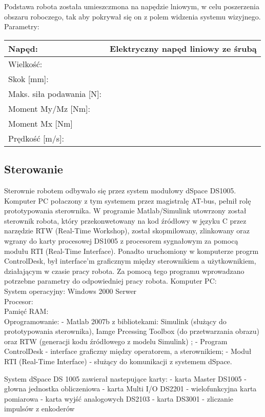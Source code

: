 \vspace{5mm}

Podstawa robota została umieszczmona na napędzie lniowym, w celu poszerzenia obszaru roboczego, tak aby pokrywał się on z polem widzenia systemu wizyjnego.\\
Parametry:\\
\begin{tabular}{|l|l|}\hline
Napęd: & Elektryczny napęd liniowy ze śrubą \\ \hline
Wielkość: & \\ \hline
Skok [mm]: & \\ \hline
Maks. siła podawania [N]: & \\ \hline
Moment My/Mz [Nm]: & \\ \hline
Moment Mx [Nm] & \\ \hline
Prędkość [m/s]: & \\ \hline
\end{tabular}
\subsection{Sterowanie}
Sterownie robotem odbywało się przez system modułowy dSpace DS1005. Komputer PC połaczony z tym systemem przez magistralę AT-bus, pełnił rolę prototypowania sterownika. W programie Matlab/Simulink utowrzony został sterownik robota, który przekonwetowany na kod źródłowy w języku C przez narzędzie RTW (Real-Time Workshop), został skopmilowany, zlinkowany oraz wgrany do karty procesowej DS1005 z procesorem sygnałowym za pomocą modułu RTI (Real-Time Interface). Ponadto uruchomiony w komputerze progrm ControlDesk, był interface'm graficznym  między sterownikiem a użytkownikiem, działającym w czasie pracy robota. Za pomocą tego programu wprowadzano potrzebne parametry do odpowiedniej pracy robota.
\noindent 
Komputer PC:\\
System operacyjny: Windows 2000 Serwer\\
Procesor:\\
Pamięć RAM:\\
Oprogramowanie:
- Matlab 2007b z bibliotekami: Simulink (służący do prototypowania sterownika), Iamge Prcessing Toolbox (do przetwarzania obrazu) oraz RTW (generacji kodu źródłowego z modelu Simulink) ;
- Program ControlDesk - interface graficzny między operatorem, a sterownikiem;
- Moduł RTI (Real-Time Interface) - służący do komunikacji z systemem dSpace.

System dSpace DS 1005 zawierał nastepujące karty:
- karta Master DS1005 - głowna jednostka obliczeniowa
- karta Multi I/O DS2201 - wielofunkcyjna karta pomiarowa
- karta wyjść analogowych DS2103
- karta DS3001 - zliczanie impulsów z enkoderów

